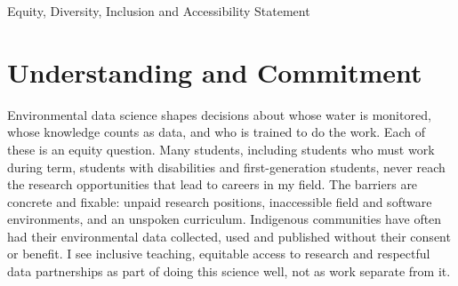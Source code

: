 \begin{applicationdocument}[
  short      = {EDIA Statement},
  page limit = 2,
]{Equity, Diversity, Inclusion and Accessibility Statement}


\section{Understanding and Commitment}
Environmental data science shapes decisions about whose water is
monitored, whose knowledge counts as data, and who is trained to do the
work. Each of these is an equity question. Many students, including
students who must work during term, students with disabilities and
first-generation students, never reach the research opportunities that
lead to careers in my field. The barriers are concrete and fixable:
unpaid research positions, inaccessible field and software environments,
and an unspoken curriculum. Indigenous communities have often had their
environmental data collected, used and published without their consent or
benefit. I see inclusive teaching, equitable access to research and
respectful data partnerships as part of doing this science well, not as
work separate from it.


\end{applicationdocument}
